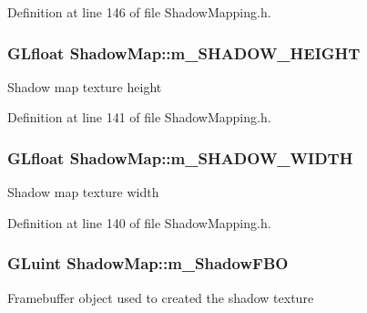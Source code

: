 Definition at line 146 of file Shadow\+Mapping.\+h.

\subsubsection[{\texorpdfstring{m\+\_\+\+S\+H\+A\+D\+O\+W\+\_\+\+H\+E\+I\+G\+HT}{m_SHADOW_HEIGHT}}]{\setlength{\rightskip}{0pt plus 5cm}G\+Lfloat Shadow\+Map\+::m\+\_\+\+S\+H\+A\+D\+O\+W\+\_\+\+H\+E\+I\+G\+HT\hspace{0.3cm}{\ttfamily [private]}}\hypertarget{class_shadow_map_aef84eb2ab2d1f970cfdcb155254d7645}{}\label{class_shadow_map_aef84eb2ab2d1f970cfdcb155254d7645}
Shadow map texture height 

Definition at line 141 of file Shadow\+Mapping.\+h.

\subsubsection[{\texorpdfstring{m\+\_\+\+S\+H\+A\+D\+O\+W\+\_\+\+W\+I\+D\+TH}{m_SHADOW_WIDTH}}]{\setlength{\rightskip}{0pt plus 5cm}G\+Lfloat Shadow\+Map\+::m\+\_\+\+S\+H\+A\+D\+O\+W\+\_\+\+W\+I\+D\+TH\hspace{0.3cm}{\ttfamily [private]}}\hypertarget{class_shadow_map_a01106ae34d919ac828e9786da7a91215}{}\label{class_shadow_map_a01106ae34d919ac828e9786da7a91215}
Shadow map texture width 

Definition at line 140 of file Shadow\+Mapping.\+h.

\subsubsection[{\texorpdfstring{m\+\_\+\+Shadow\+F\+BO}{m_ShadowFBO}}]{\setlength{\rightskip}{0pt plus 5cm}G\+Luint Shadow\+Map\+::m\+\_\+\+Shadow\+F\+BO\hspace{0.3cm}{\ttfamily [private]}}\hypertarget{class_shadow_map_aa8a296eaaa25b1ed280f0d5443b6cb82}{}\label{class_shadow_map_aa8a296eaaa25b1ed280f0d5443b6cb82}
Framebuffer object used to created the shadow texture 

